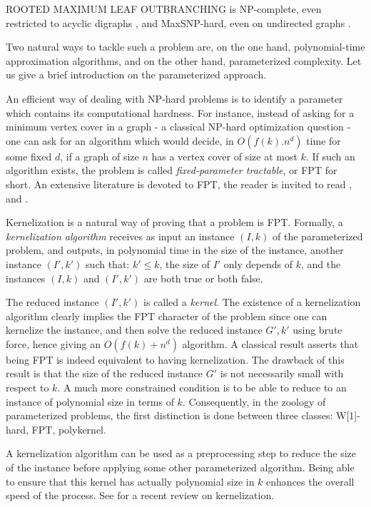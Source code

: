 \documentclass{article}
\def\RMO{R{\footnotesize{OOTED}} M{\footnotesize{AXIMUM}} L{\footnotesize{EAF}} O{\footnotesize{UTBRANCHING}} }
\begin{document}
\RMO is NP-complete, even restricted to acyclic digraphs \cite{AlonMaxLeaf2}, and MaxSNP-hard, even on undirected graphs \cite{ApxHardMaxLeaf}.

Two natural ways to tackle such a problem are, on the one hand, polynomial-time approximation algorithms, and on the other hand, parameterized complexity. Let us give a brief introduction on the parameterized approach.


\vspace{12pt}

An efficient way of dealing with NP-hard problems
is to identify a parameter which contains its 
computational hardness. For instance, instead 
of asking for a minimum vertex cover in a graph -
a classical NP-hard optimization question - one
can ask for an algorithm which would decide, in
$O(f(k).n^d)$ time for some fixed $d$, if a graph 
of size $n$ has a  vertex cover of size at 
most $k$. If such an algorithm exists, the problem
is called {\it fixed-parameter tractable}, or FPT for 
short. An extensive literature is devoted to FPT, 
the reader is invited to read \cite{DowneyFellows}, \cite{FlumGrohe}
and \cite{NiedBookFPT}.

Kernelization is a natural way of proving that a 
problem is FPT. Formally, a {\it kernelization algorithm}
receives as input an instance $(I,k)$ of the parameterized
problem, and outputs, in polynomial time  in the size of 
the instance, another instance $(I',k')$ such that: $k'\leq k$, the size of $I'$ only depends of $k$, and the instances $(I,k)$ and $(I',k')$ are both true or both false.



The reduced instance $(I',k')$ is called a {\it kernel}.
The existence of a kernelization algorithm 
clearly implies the FPT character of the problem since 
one can kernelize the instance, and then solve the reduced
instance $G',k'$ using brute force, hence giving an 
$O(f(k)+n^d)$ algorithm. 
A classical result asserts that being FPT is indeed equivalent to 
having kernelization. The drawback of this result is that 
the size of the reduced instance $G'$ is not necessarily 
small with respect to $k$. A much more constrained condition
is to be able to reduce to an instance of polynomial 
size in terms of $k$. Consequently, in the zoology of parameterized 
problems, the first distinction is done between three classes: 
W[1]-hard, FPT, polykernel. 

A kernelization algorithm can be used as a preprocessing step to reduce the size of the instance before applying some other parameterized algorithm. Being able to ensure that this kernel has actually polynomial size in $k$ enhances the overall speed of the process. See \cite{GuoNiedFPT} for a recent review on kernelization.
\end{document}
